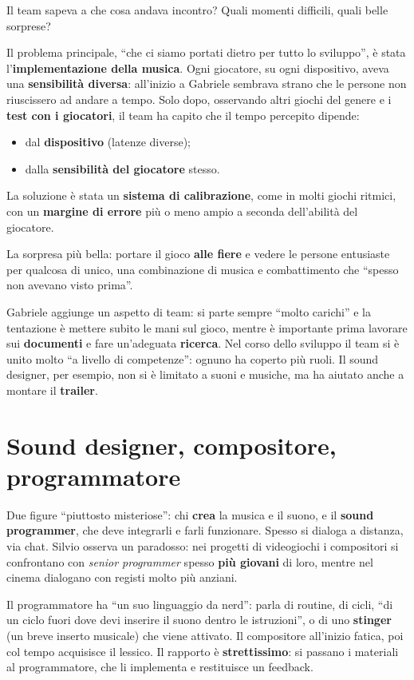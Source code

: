 Il team sapeva a che cosa andava incontro? Quali momenti difficili, quali belle
sorprese?

Il problema principale, ``che ci siamo portati dietro per tutto lo sviluppo'', è
stata l'\textbf{implementazione della musica}. Ogni giocatore, su ogni
dispositivo, aveva una \textbf{sensibilità diversa}: all'inizio a Gabriele
sembrava strano che le persone non riuscissero ad andare a tempo. Solo dopo,
osservando altri giochi del genere e i \textbf{test con i giocatori}, il team ha
capito che il tempo percepito dipende:
\begin{itemize}
  \item dal \textbf{dispositivo} (latenze diverse);
  \item dalla \textbf{sensibilità del giocatore} stesso.
\end{itemize}
La soluzione è stata un \textbf{sistema di calibrazione}, come in molti giochi
ritmici, con un \textbf{margine di errore} più o meno ampio a seconda dell'abilità
del giocatore.

La sorpresa più bella: portare il gioco \textbf{alle fiere} e vedere le persone
entusiaste per qualcosa di unico, una combinazione di musica e combattimento che
``spesso non avevano visto prima''.

Gabriele aggiunge un aspetto di team: si parte sempre ``molto carichi'' e la
tentazione è mettere subito le mani sul gioco, mentre è importante prima
lavorare sui \textbf{documenti} e fare un'adeguata \textbf{ricerca}. Nel corso
dello sviluppo il team si è unito molto ``a livello di competenze'': ognuno ha
coperto più ruoli. Il sound designer, per esempio, non si è limitato a suoni e
musiche, ma ha aiutato anche a montare il \textbf{trailer}.

\section{Sound designer, compositore, programmatore}
\label{sec:c1-5-ruoli}

Due figure ``piuttosto misteriose'': chi \textbf{crea} la musica e il suono, e il
\textbf{sound programmer}, che deve integrarli e farli funzionare. Spesso si
dialoga a distanza, via chat. Silvio osserva un paradosso: nei progetti di
videogiochi i compositori si confrontano con \emph{senior programmer} spesso
\textbf{più giovani} di loro, mentre nel cinema dialogano con registi molto più
anziani.

Il programmatore ha ``un suo linguaggio da nerd'': parla di routine, di cicli,
``di un ciclo fuori dove devi inserire il suono dentro le istruzioni'', o di uno
\textbf{stinger} (un breve inserto musicale) che viene attivato. Il compositore
all'inizio fatica, poi col tempo acquisisce il lessico. Il rapporto è
\textbf{strettissimo}: si passano i materiali al programmatore, che li
implementa e restituisce un feedback.

